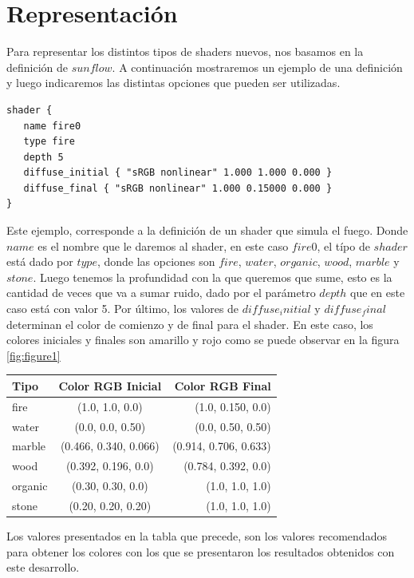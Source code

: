 \documentclass[a4paper,10pt]{article}
\begin{document}
\section{Representación}
\label{representacion}

Para representar los distintos tipos de shaders nuevos, nos basamos en la
definición de $sunflow$. A continuación mostraremos un ejemplo de una
definición y luego indicaremos las distintas opciones que pueden ser utilizadas.

\begin{verbatim}
shader {
   name fire0
   type fire
   depth 5
   diffuse_initial { "sRGB nonlinear" 1.000 1.000 0.000 }
   diffuse_final { "sRGB nonlinear" 1.000 0.15000 0.000 }
}                         
\end{verbatim}

Este ejemplo, corresponde a la definición de un shader que simula el fuego.
Donde $name$ es el nombre que le daremos al shader, en este caso $fire0$, el
típo de $shader$ está dado por $type$, donde las opciones son $fire$, $water$,
$organic$, $wood$, $marble$ y $stone$.  Luego tenemos la profundidad con la que
queremos que sume, esto es la cantidad de veces que va a sumar ruido, dado por
el parámetro $depth$ que en este caso está con valor 5.  Por último, los
valores de $diffuse_initial$ y $diffuse_final$ determinan el color de comienzo
y de final para el shader.  En este caso, los colores iniciales y finales son
amarillo y rojo como se puede observar en la figura \ref{fig:figure1}

\begin{center}
  \begin{tabular}{ | l || c | r | }
    \hline                       
    Tipo & Color RGB Inicial & Color RGB Final \\
    \hline
    \hline
    fire & (1.0, 1.0, 0.0) & (1.0, 0.150, 0.0) \\
    water & (0.0, 0.0, 0.50) & (0.0, 0.50, 0.50) \\
    marble & (0.466, 0.340, 0.066) & (0.914, 0.706, 0.633) \\
    wood & (0.392, 0.196, 0.0) & (0.784, 0.392, 0.0)
\\
    organic & (0.30, 0.30, 0.0) & (1.0, 1.0, 1.0) \\
    stone & (0.20, 0.20, 0.20) & (1.0, 1.0, 1.0) \\
    \hline  
  \end{tabular}
\end{center}

Los valores presentados en la tabla que precede, son los valores recomendados
para obtener los colores con los que se presentaron los resultados obtenidos
con este desarrollo.
\end{document}
